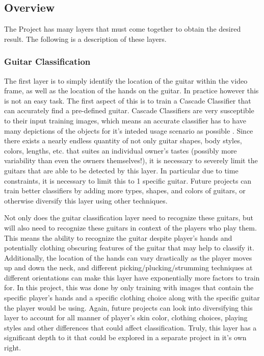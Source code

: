 \subsection{Overview}
The \project Project has many layers that must come together to obtain the desired result.
The following is a description of these layers.
\subsubsection{Guitar Classification}
The first layer is to simply identify the location of the guitar within the video frame,
as well as the location of the hands on the guitar.
In practice however this is not an easy task.
The first aspect of this is to train a Cascade Classifier that can accurately find a pre-defined guitar.
Cascade Classifiers are very susceptible to their input training images,
which means an accurate classifier has to have many depictions of the objects
for it's inteded usage scenario as possible \cite{opencv,codingrobin}.
Since there exists a nearly endless quantity of not only guitar shapes, body styles, colors, lengths, etc.
that suites an individual owner's tastes (possibly more variability than even the owners themselves!),
it is necessary to severely limit the guitars that are able to be detected by this layer.
In particular due to time constraints, it is necessary to limit this to 1 specific guitar.
Future projects can train better classifiers by adding more types, shapes, and colors of guitars,
or otherwise diversify this layer using other techniques.
\par
Not only does the guitar classification layer need to recognize these guitars,
but will also need to recognize these guitars in context of the players who play them.
This means the ability to recognize the guitar despite player's hands and potentially clothing obscuring
features of the guitar that may help to classify it.
Additionally, the location of the hands can vary drastically as the player moves up and down the neck,
and different picking/plucking/strumming techniques at different orientations can make this layer have exponentially more factors to train for.
In this project, this was done by only training with images that contain the specific player's hands
and a specific clothing choice along with the specific guitar the player would be using.
Again, future projects can look into diversifying this layer to account for all manner of player's
skin color, clothing choices, playing styles and other differences that could affect classification.
Truly, this layer has a significant depth to it that could be explored in a separate project in it's own right.
